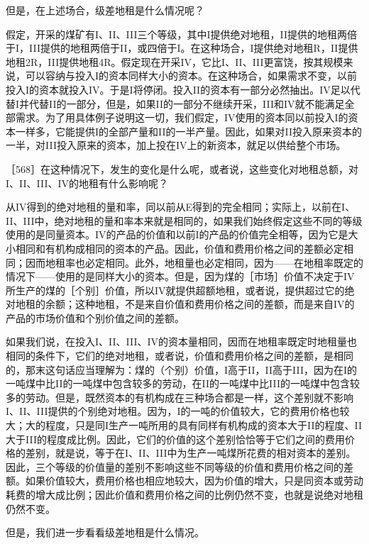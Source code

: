 
但是，在上述场合，级差地租是什么情况呢？

假定，开采的煤矿有I、II、III三个等级，其中I提供绝对地租，II提供的地租两倍于I，III提供的地租两倍于II，或四倍于I。在这种场合，I提供绝对地租R，II提供地租2R，III提供地租4R。假定现在开采IV，它比I、II、III更富饶，按其规模来说，可以容纳与投入I的资本同样大小的资本。在这种场合，如果需求不变，以前投入I的资本就投入IV。于是I将停闭。投入II的资本有一部分必然抽出。IV足以代替I并代替II的一部分，但是，如果II的一部分不继续开采，III和IV就不能满足全部需求。为了用具体例子说明这一切，我们假定，IV使用的资本同以前投入I的资本一样多，它能提供I的全部产量和II的一半产量。因此，如果对II投入原来资本的一半，对III投入原来的资本，加上投在IV上的新资本，就足以供给整个市场。

［568］在这种情况下，发生的变化是什么呢，或者说，这些变化对地租总额，对I、II、III、IV的地租有什么影响呢？

从IV得到的绝对地租的量和率，同以前从E得到的完全相同；实际上，以前在I、II、III中，绝对地租的量和率本来就是相同的，如果我们始终假定这些不同的等级使用的是同量资本。IV的产品的价值和以前I的产品的价值完全相等，因为它是大小相同和有机构成相同的资本的产品。因此，价值和费用价格之间的差额必定相同；因而地租率也必定相同。此外，地租量也必定相同，因为——在地租率既定的情况下——使用的是同样大小的资本。但是，因为煤的［市场］价值不决定于IV所生产的煤的［个别］价值，所以IV就提供超额地租，或者说，提供超过它的绝对地租的余额；这种地租，不是来自价值和费用价格之间的差额，而是来自IV的产品的市场价值和个别价值之间的差额。

如果我们说，在投入I、II、III、IV的资本量相同，因而在地租率既定时地租量也相同的条件下，它们的绝对地租，或者说，价值和费用价格之间的差额，是相同的，那末这句话应当理解为：煤的（个别）价值，I高于II，II高于III，因为在I的一吨煤中比II的一吨煤中包含较多的劳动，在II的一吨煤中比III的一吨煤中包含较多的劳动。但是，既然资本的有机构成在三种场合都是一样，这个差别就不影响I、II、III提供的个别绝对地租。因为，I的一吨的价值较大，它的费用价格也较大；大的程度，只是同I生产一吨所用的具有同样有机构成的资本大于II的程度、II大于III的程度成比例。因此，它们的价值的这个差别恰恰等于它们之间的费用价格的差别，就是说，等于在I、II、III中为生产一吨煤所花费的相对资本的差别。因此，三个等级的价值量的差别不影响这些不同等级的价值和费用价格之间的差额。如果价值较大，费用价格也相应地较大，因为价值的增大，只是同资本或劳动耗费的增大成比例；因此价值和费用价格之间的比例仍然不变，也就是说绝对地租仍然不变。

但是，我们进一步看看级差地租是什么情况。


